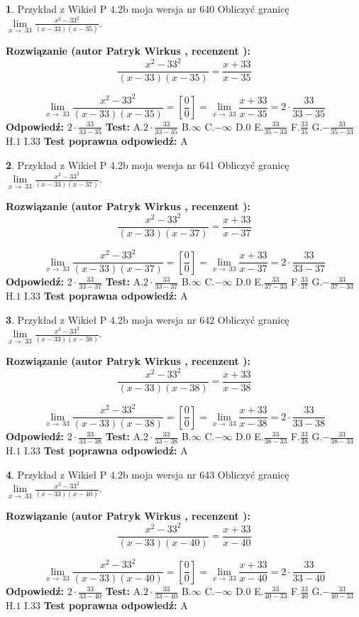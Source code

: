 \documentclass[12pt, a4paper]{article}
\theoremstyle{definition} %
\newtheorem{zad}{}
\newcommand{\zadStart}[1]{\begin{zad}#1\newline}
\newcommand{\zadStop}{\end{zad}}
\newcommand{\rozwStart}[2]{\noindent \textbf{Rozwiązanie (autor #1 , recenzent #2): }\newline}
\newcommand{\rozwStop}{\newline}
\newcommand{\odpStart}{\noindent \textbf{Odpowiedź:}\newline}
\newcommand{\odpStop}{\newline}
\newcommand{\testStart}{\noindent \textbf{Test:}\newline}
\newcommand{\testStop}{\newline}
\newcommand{\kluczStart}{\noindent \textbf{Test poprawna odpowiedź:}\newline}
\newcommand{\kluczStop}{\newline}
\begin{document}
\zadStart{Przykład z Wikieł P 4.2b moja wersja nr 640}
Obliczyć granicę $\lim\limits_{x\to\ 33}\frac{x^{2}-33^{2}}{(x-33)(x-35)}$.
\zadStop
\rozwStart{Patryk Wirkus}{}
$$\frac{x^{2}-33^{2}}{(x-33)(x-35)}=\frac{x+33}{x-35}$$

$$\lim\limits_{x\to\ 33}\frac{x^{2}-33^{2}}{(x-33)(x-35)}=[\frac{0}{0}]=\lim\limits_{x\to\ 33}\frac{x+33}{x-35}=2 \cdot \frac{33}{33-35}$$
\rozwStop
\odpStart
$2 \cdot \frac{33}{33-35}$
\odpStop
\testStart
A.$2 \cdot \frac{33}{33-35}$
B.$\infty$
C.$-\infty$
D.$0$
E.$\frac{33}{35-33}$
F.$\frac{33}{35}$
G.$-\frac{33}{35-33}$
H.$1$
I.$33$
\testStop
\kluczStart
A
\kluczStop



\zadStart{Przykład z Wikieł P 4.2b moja wersja nr 641}
Obliczyć granicę $\lim\limits_{x\to\ 33}\frac{x^{2}-33^{2}}{(x-33)(x-37)}$.
\zadStop
\rozwStart{Patryk Wirkus}{}
$$\frac{x^{2}-33^{2}}{(x-33)(x-37)}=\frac{x+33}{x-37}$$

$$\lim\limits_{x\to\ 33}\frac{x^{2}-33^{2}}{(x-33)(x-37)}=[\frac{0}{0}]=\lim\limits_{x\to\ 33}\frac{x+33}{x-37}=2 \cdot \frac{33}{33-37}$$
\rozwStop
\odpStart
$2 \cdot \frac{33}{33-37}$
\odpStop
\testStart
A.$2 \cdot \frac{33}{33-37}$
B.$\infty$
C.$-\infty$
D.$0$
E.$\frac{33}{37-33}$
F.$\frac{33}{37}$
G.$-\frac{33}{37-33}$
H.$1$
I.$33$
\testStop
\kluczStart
A
\kluczStop



\zadStart{Przykład z Wikieł P 4.2b moja wersja nr 642}
Obliczyć granicę $\lim\limits_{x\to\ 33}\frac{x^{2}-33^{2}}{(x-33)(x-38)}$.
\zadStop
\rozwStart{Patryk Wirkus}{}
$$\frac{x^{2}-33^{2}}{(x-33)(x-38)}=\frac{x+33}{x-38}$$

$$\lim\limits_{x\to\ 33}\frac{x^{2}-33^{2}}{(x-33)(x-38)}=[\frac{0}{0}]=\lim\limits_{x\to\ 33}\frac{x+33}{x-38}=2 \cdot \frac{33}{33-38}$$
\rozwStop
\odpStart
$2 \cdot \frac{33}{33-38}$
\odpStop
\testStart
A.$2 \cdot \frac{33}{33-38}$
B.$\infty$
C.$-\infty$
D.$0$
E.$\frac{33}{38-33}$
F.$\frac{33}{38}$
G.$-\frac{33}{38-33}$
H.$1$
I.$33$
\testStop
\kluczStart
A
\kluczStop



\zadStart{Przykład z Wikieł P 4.2b moja wersja nr 643}
Obliczyć granicę $\lim\limits_{x\to\ 33}\frac{x^{2}-33^{2}}{(x-33)(x-40)}$.
\zadStop
\rozwStart{Patryk Wirkus}{}
$$\frac{x^{2}-33^{2}}{(x-33)(x-40)}=\frac{x+33}{x-40}$$

$$\lim\limits_{x\to\ 33}\frac{x^{2}-33^{2}}{(x-33)(x-40)}=[\frac{0}{0}]=\lim\limits_{x\to\ 33}\frac{x+33}{x-40}=2 \cdot \frac{33}{33-40}$$
\rozwStop
\odpStart
$2 \cdot \frac{33}{33-40}$
\odpStop
\testStart
A.$2 \cdot \frac{33}{33-40}$
B.$\infty$
C.$-\infty$
D.$0$
E.$\frac{33}{40-33}$
F.$\frac{33}{40}$
G.$-\frac{33}{40-33}$
H.$1$
I.$33$
\testStop
\kluczStart
A
\kluczStop
\end{document}
